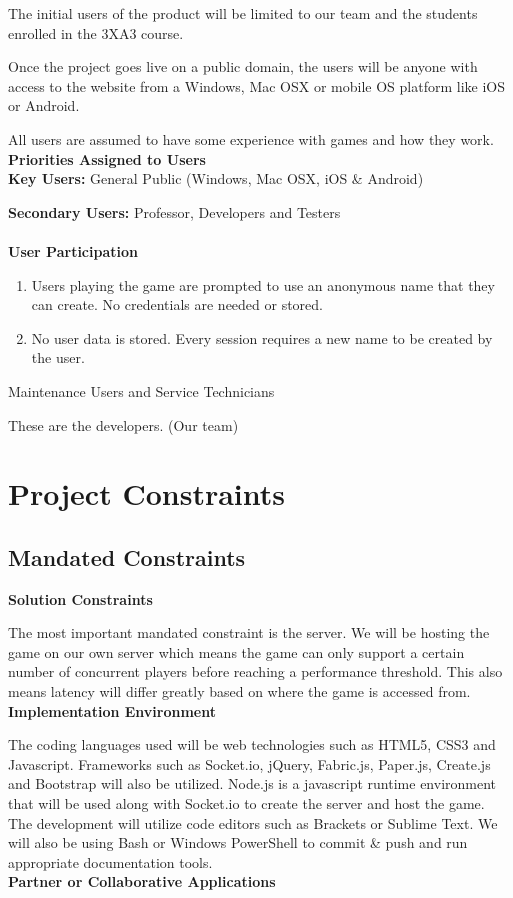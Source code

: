 \documentclass[12pt]{article}
\begin{document}
The initial users of the product will be limited to our team and the students enrolled in the 3XA3 course.

Once the project goes live on a public domain, the users will be anyone with access to the website from a Windows, Mac OSX or mobile OS platform like iOS or Android.

All users are assumed to have some experience with games and how they work.\\
\textbf{Priorities Assigned to Users}\\

\textbf{Key Users:} General Public (Windows, Mac OSX, iOS & Android)

\textbf{Secondary Users:} Professor, Developers and Testers\\\\
\textbf{User Participation}
\begin{enumerate}
\item Users playing the game are prompted to use an anonymous name that they can create. No credentials are needed or stored.
\item No user data is stored. Every session requires a new name to be created by the user.
\end{enumerate}
Maintenance Users and Service Technicians

These are the developers. (Our team)
\section{Project Constraints}
\subsection{Mandated Constraints}
\textbf{Solution Constraints}

The most important mandated constraint is the server. We will be hosting the game on our own server which means the game can only support a certain number of concurrent players before reaching a performance threshold. This also means latency will differ greatly based on where the game is accessed from.\\
\textbf{Implementation Environment}

The coding languages used will be web technologies such as HTML5, CSS3 and Javascript.
Frameworks such as Socket.io, jQuery, Fabric.js, Paper.js, Create.js and Bootstrap will also be utilized.
Node.js is a javascript runtime environment that will be used along with Socket.io to create the server and host the game.
The development will utilize code editors such as Brackets or Sublime Text. We will also be using Bash or Windows PowerShell to commit & push and run appropriate documentation tools.\\
\textbf{Partner or Collaborative Applications}
\end{document}
